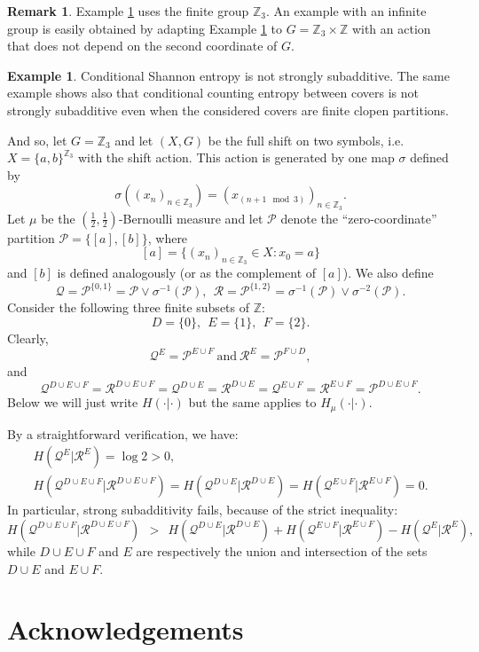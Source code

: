 \documentclass[12pt]{amsart}
\theoremstyle{definition}
\newtheorem{exam}[theorem]{Example}
\newtheorem{remark}[theorem]{Remark}
\numberwithin{equation}{section}
\def \Z {\mathbb Z}
\def \R {\mathcal R}
\def \Q {\mathcal Q}
\def \P {\mathcal P}
\def \Z {\mathbb Z}
\def \R {\mathcal R}
\def \Q {\mathcal Q}
\def \P {\mathcal P}
\begin{document}
\begin{remark}
Example \ref{example} uses the finite group $\Z_3$. An example with an infinite group is easily obtained by adapting Example \ref{example} to $G=\Z_3\times\Z$ with an action that does not depend on the second coordinate of $G$. 
\end{remark}
\begin{exam}\label{example}
Conditional Shannon entropy is not strongly subadditive. The same example shows also that conditional counting entropy between covers is not strongly subadditive even when the considered covers are finite clopen partitions.
\end{exam}
\noindent And so, let $G= \Z_3$ and let $(X,G)$ be the full shift on two symbols, i.e.\ $X=\{a,b\}^{\Z_3}$ with the shift action. This action is generated by one map $\sigma$
defined by 
$$
\sigma((x_n)_{n\in\Z_3}) = (x_{(n+1\!\!\!\!\!\mod 3)})_{n\in\Z_3}.
$$ 
Let $\mu$ be the $(\frac12,\frac12)$-Bernoulli measure and let $\P$ denote the ``zero-coordinate'' partition $\P=\{[a],[b]\}$, where
$$
[a]=\{(x_n)_{n\in\Z_3}\in X:x_0=a\}
$$
and $[b]$ is defined analogously (or as the complement of $[a]$).
We also define 
$$
\Q=\P^{\{0,1\}}=\P\vee\sigma^{-1}(\P),\ \  \R=\P^{\{1,2\}}=\sigma^{-1}(\P)\vee\sigma^{-2}(\P).
$$
Consider the following three finite subsets of $\Z$:
$$
D=\{0\}, \ \ E=\{1\}, \ \ F=\{2\}. 
$$
Clearly,
$$
\Q^E= \P^{E\cup F}\ \text{and}\ \R^E= \P^{F\cup D},
$$ 
and
$$
\Q^{D\cup E\cup F}=\R^{D\cup E\cup F}=\Q^{D\cup E}=\R^{D\cup E}=\Q^{E\cup F}=\R^{E\cup F}= \P^{D\cup E\cup F}.
$$
Below we will just write $H(\cdot|\cdot)$ but the same applies to $H_\mu(\cdot|\cdot)$.

By a straightforward verification, we have:
\begin{gather*}
H(\Q^E|\R^E)=\log 2>0,\\
H(\Q^{D\cup E\cup F}|\R^{D\cup E\cup F})= H(\Q^{D\cup E}|\R^{D\cup E})= H(\Q^{E\cup F}| \R^{E\cup F})=0.
\end{gather*}
In particular, strong subadditivity fails, because of the strict inequality:
$$
H(\Q^{D\cup E\cup F}|\R^{D\cup E\cup F})\ \ >\ \ H(\Q^{D\cup E}|\R^{D\cup E})+ H(\Q^{E\cup F}|\R^{E\cup F}) - H(\Q^E|\R^E),
$$	
while $D\!\cup\!E\!\cup\!F$ and $E$ are respectively the union and intersection of the sets $D\!\cup\!E$ and $E\!\cup\!F$.

\section*{Acknowledgements}
\end{document}
